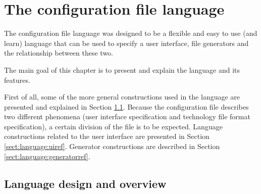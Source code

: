 
\chapter{The configuration file language} \label{chap:language}
The configuration file language was designed to be a flexible and easy to use (and
learn) language that can be used to specify a user interface, file generators
and the relationship between these two.

\bigskip \noindent
The main goal of this chapter is to present and explain the language and its
features.

\bigskip \noindent
First of all, some of the more general constructions used in the language are
presented and explained in Section \ref{sect:language:structure}. Because the
configuration file describes two different phenomena (user interface
specification and technology file format specification), a certain division of
the file is to be expected. Language constructions related to the user
interface are presented in Section \ref{sect:language:uiref}. Generator
constructions are described in Section \ref{sect:language:generatorref}.



\section{Language design and overview} \label{sect:language:structure}

